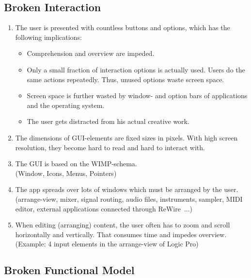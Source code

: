 \documentclass[12pt]{article}
\begin{document}
\subsection{Broken Interaction}
\begin{enumerate}
\item The user is presented with countless buttons and options, which has the following implications:
\begin{itemize}
\item Comprehension and overview are impeded.
\item Only a small fraction of interaction options is actually used. Users do the same actions repeatedly. Thus, unused options waste screen space.
\item Screen space is further wasted by window- and option bars of  applications and the operating system.
\item The user gets distracted from his actual creative work.
\end{itemize}
\item The dimensions of GUI-elements are fixed sizes in pixels. With high screen resolution, they become hard to read and hard to interact with.
\item The GUI is based on the WIMP-schema.\\(Window, Icons, Menus, Pointers)
\item The app spreads over lots of windows which must be arranged by the user. (arrange-view, mixer, signal routing, audio files, instruments, sampler, MIDI editor, external applications connected through ReWire~...)
\item When editing (arranging) content, the user often has to zoom and scroll horizontally and vertically. That consumes time and impedes overview. (Example: 4 input elements in the arrange-view of Logic Pro)
\end{enumerate}

\subsection{Broken Functional Model}
\end{document}
